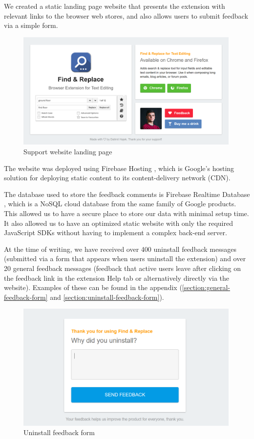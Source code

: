\documentclass[bsc,frontabs,twoside,singlespacing,parskip,deptreport]{infthesis}
\begin{document}
We created a static landing page website that presents the extension with relevant links to the browser web stores, and also allows users to submit feedback via a simple form.

\begin{figure}[h]
\centering
\includegraphics[width=0.99\textwidth]{../graphics/landing-page.png}
\caption{Support website landing page}
\end{figure}

The website was deployed using Firebase Hosting \cite{A8}, which is Google's hosting solution for deploying static content to its content-delivery network (CDN).

The database used to store the feedback comments is Firebase Realtime Database \cite{A9}, which is a NoSQL cloud database from the same family of Google products. This allowed us to have a secure place to store our data with minimal setup time. It also allowed us to have an optimized static website with only the required JavaScript SDKs without having to implement a complex back-end server.

At the time of writing, we have received over 400 uninstall feedback messages (submitted via a form that appears when users uninstall the extension) and over 20 general feedback messages (feedback that active users leave after clicking on the feedback link in the extension Help tab or alternatively directly via the website). Examples of these can be found in the appendix (\autoref{section:general-feedback-form} and \autoref{section:uninstall-feedback-form}).

\begin{figure}[h]
\centering
\includegraphics[width=0.99\textwidth]{../docs/feedback-form.png}
\caption{Uninstall feedback form}
\end{figure}
\end{document}
